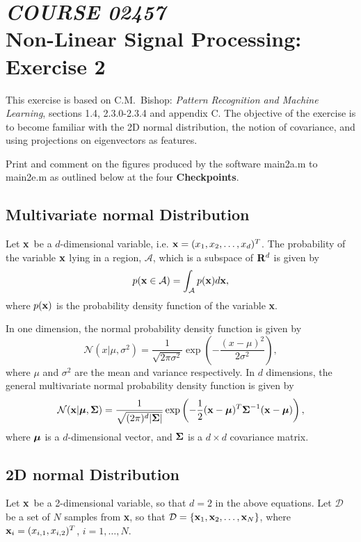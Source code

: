 \documentclass[times,12pt]{article}    %
\def\x{{\bf x}}
\def\A{\mathcal{A}}
\def\D{\mathcal{D}}
\def\m{\text{\boldmath $\mu$}}
\def\S{\text{\boldmath $\Sigma$}}
\begin{document}
\section*{{\it COURSE 02457}\\[5mm] Non-Linear Signal Processing: Exercise 2}

This exercise is based on C.M.\ Bishop: {\it Pattern Recognition
and Machine Learning}, sections 1.4, 2.3.0-2.3.4 and appendix C.
The objective of the exercise is to become familiar with the 2D
normal distribution, the notion of covariance,  and using
projections on eigenvectors as features.

Print and comment on the figures produced by the software {\sf
 main2a.m} to {\sf main2e.m} as outlined below at the four {\bf
 Checkpoints}.


\subsection*{Multivariate normal Distribution}
Let \x\ be a $d$-dimensional variable, i.e. $\x =
(x_1,x_2,\ldots,x_d)^T$.  The probability of the variable $\x$ lying in a
region, $\A$, which is a subspace of ${\bf R}^d$ is given by
\begin{equation}
p(\x \in \A) = \int_{\A} p(\x) d\x,
\end{equation}
where $p(\x)$ is the probability density function of the variable \x.

In one dimension, the normal probability density function  is given by
\begin{equation}
\mathcal{N}(x|\mu, \sigma^2) = \frac{1}{\sqrt{2\pi \sigma^2}}\exp \left( -\frac{(x-\mu)^2}{2\sigma^2}\right),
\end{equation}
where $\mu$ and $\sigma^2$ are the mean and variance respectively. In
$d$ dimensions, the general multivariate normal probability density
function is given by
\begin{equation}
\mathcal{N}(\x|\m, \S) = \frac{1}{\sqrt{(2\pi)^d |\S|}}\exp \left(
  -\frac{1}{2}(\x-\m)^T \S^{-1} (\x-\m)  \right),
\end{equation}
where $\m$ is a $d$-dimensional vector, and $\S$ is a $d\times
d$ covariance matrix.

\subsection*{2D normal Distribution}
Let \x\ be a 2-dimensional variable, so that $d=2$ in the above
equations. Let $\D$ be a set of $N$ samples from \x, so that $\D =
\{\x_1, \x_2, \ldots ,\x_N\}$, where $\x_i = (x_{i,1}, x_{i,2})^T$,
$i=1,\ldots ,N$.
\end{document}
